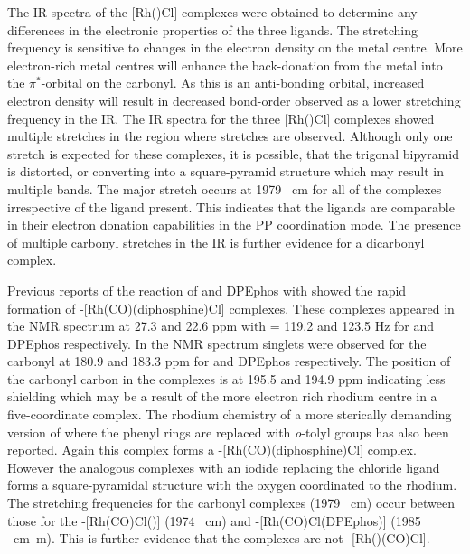 The \gls{IR} spectra of the [Rh(\tBuxantphos)Cl] complexes were obtained to determine any differences in the electronic properties of the three ligands.  The  stretching frequency is sensitive to changes in the electron density on the metal centre.  More electron-rich metal centres will enhance the back-donation from the metal into the $\pi^*$-orbital on the carbonyl.  As this is an anti-bonding orbital, increased electron density will result in decreased bond-order observed as a lower  stretching frequency in the \gls{IR}.  The \gls{IR} spectra for the three [Rh(\tBuxantphos)Cl] complexes showed multiple stretches in the region where  stretches are observed.  Although only one stretch is expected for these complexes, it is possible, that the trigonal bipyramid is distorted, or converting into a square-pyramid structure\cite{Sanger1985} which may result in multiple bands.  The major  stretch occurs at 1979 \si{\per\centi\metre} for all of the complexes irrespective of the \tBuxantphos{} ligand present.  This indicates that the ligands are comparable in their electron donation capabilities in the \dento{}PP\textprime{} coordination mode.  The presence of multiple carbonyl stretches in the \gls{IR} is further evidence for a dicarbonyl complex.  

Previous reports of the reaction of \Phxantphos{} and DPEphos with  showed the rapid formation of \trans-{[Rh(CO)(diphosphine)Cl]} complexes.\cite{Deb2010}  These complexes appeared in the \phosphorus{} NMR spectrum at 27.3 and 22.6 ppm with \JRhP = 119.2 and 123.5 Hz for \Phxantphos{} and DPEphos respectively.  In the \carbon{} NMR spectrum singlets were observed for the carbonyl at 180.9 and 183.3 ppm for \Phxantphos{} and DPEphos respectively.  The position of the carbonyl carbon in the \tBuxantphos{} complexes is at 195.5 and 194.9 ppm indicating less shielding which may be a result of the more electron rich rhodium centre in a five-coordinate complex.  The rhodium chemistry of a more sterically demanding version of \Phxantphos{} where the phenyl rings are replaced with \emph{o}-tolyl groups has also been reported.\cite{Williams2011}  Again this complex forms a \trans-[Rh(CO)(diphosphine)Cl] complex.  However the analogous complexes with an iodide replacing the chloride ligand forms a square-pyramidal structure with the oxygen coordinated to the rhodium.  The  stretching frequencies for the \tBuxantphos{} carbonyl complexes (1979 \si{\per\centi\metre}) occur between those for the \trans-[Rh(CO)Cl(\Phxantphos)] (1974 \si{\per\centi\metre}) and \trans-[Rh(CO)Cl(DPEphos)] (1985 \si{\per\cm\metre}).  This is further evidence that the \tBuxantphos{} complexes are not \trans-[Rh(\tBuxantphos)(CO)Cl].  

